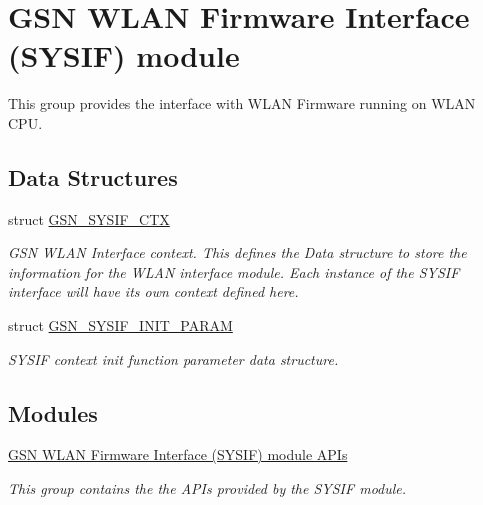 \hypertarget{a00630}{
\section{GSN WLAN Firmware Interface (SYSIF) module}
\label{a00630}
}


This group provides the interface with WLAN Firmware running on WLAN CPU.  


\subsection*{Data Structures}
\begin{DoxyCompactItemize}
\item 
struct \hyperlink{a00261}{GSN\_\-SYSIF\_\-CTX}
\begin{DoxyCompactList}\small\item\em GSN WLAN Interface context. This defines the Data structure to store the information for the WLAN interface module. Each instance of the SYSIF interface will have its own context defined here. \end{DoxyCompactList}\item 
struct \hyperlink{a00262}{GSN\_\-SYSIF\_\-INIT\_\-PARAM}
\begin{DoxyCompactList}\small\item\em SYSIF context init function parameter data structure. \end{DoxyCompactList}\end{DoxyCompactItemize}
\subsection*{Modules}
\begin{DoxyCompactItemize}
\item 
\hyperlink{a00631}{GSN WLAN Firmware Interface (SYSIF) module APIs}


\begin{DoxyCompactList}\small\item\em This group contains the the APIs provided by the SYSIF module. \end{DoxyCompactList}

\end{DoxyCompactItemize}
